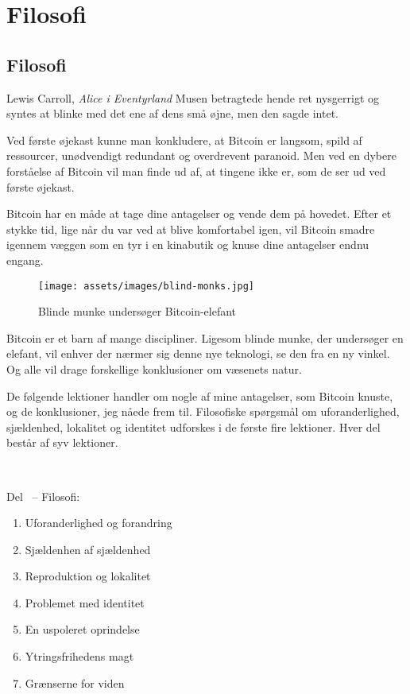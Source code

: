\part{Filosofi}
\label{ch:filosofi}
\chapter*{Filosofi}

\begin{chapquote}{Lewis Carroll, \textit{Alice i Eventyrland}}
Musen betragtede hende ret nysgerrigt og syntes at blinke med det ene af dens 
små øjne, men den sagde intet.
\end{chapquote}

Ved første øjekast kunne man konkludere, at Bitcoin er langsom, spild af 
ressourcer, unødvendigt redundant og overdrevent paranoid. Men ved en dybere 
forståelse af Bitcoin vil man finde ud af, at tingene ikke er, som de ser ud 
ved første øjekast.

Bitcoin har en måde at tage dine antagelser og vende dem på hovedet. Efter et 
stykke tid, lige når du var ved at blive komfortabel igen, vil Bitcoin smadre 
igennem væggen som en tyr i en kinabutik og knuse dine antagelser endnu engang.

\begin{figure}[htbp]
  \centering
  \texttt{[image: assets/images/blind-monks.jpg]}
  \caption{Blinde munke undersøger Bitcoin-elefant}
  \label{fig:blind-monks}
\end{figure}

Bitcoin er et barn af mange discipliner. Ligesom blinde munke, der undersøger en 
elefant, vil enhver der nærmer sig denne nye teknologi, se den fra en ny 
vinkel. Og alle vil drage forskellige konklusioner om væsenets natur.

De følgende lektioner handler om nogle af mine antagelser, som Bitcoin knuste, 
og de konklusioner, jeg nåede frem til. Filosofiske spørgsmål om 
uforanderlighed, sjældenhed, lokalitet og identitet udforskes i de første fire 
lektioner. Hver del består af syv lektioner.

~

\begin{samepage}
Del~\ref{ch:filosofi} -- Filosofi:

\begin{enumerate}
  \item Uforanderlighed og forandring
  \item Sjældenhen af sjældenhed
  \item Reproduktion og lokalitet
  \item Problemet med identitet
  \item En uspoleret oprindelse
  \item Ytringsfrihedens magt
  \item Grænserne for viden
\end{enumerate}
\end{samepage}

